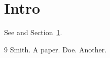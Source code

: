 \documentclass{article}
\begin{document}
\section{Intro}\label{sec:intro}
See \cite{smith2020,doe19} and Section~\ref{sec:intro}.

\begin{thebibliography}{9}
 Smith. A paper.
 Doe. Another.
\end{thebibliography}
\end{document}
